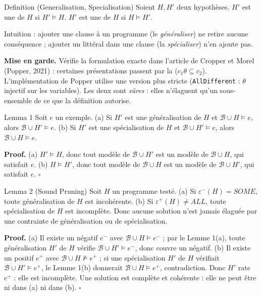 \documentclass[10pt]{article}
\begin{document}
\begin{enonce}{Definition (Generalisation, Specialisation)}
Soient $H,H'$ deux hypothèses. $H'$ est une  de $H$ si $H'\models H$.
$H'$ est une  de $H$ si $H\models H'$.
\end{enonce}
Intuition : ajouter une clause à un programme (le \emph{généraliser}) ne retire aucune conséquence ; ajouter un littéral dans une clause (la \emph{spécialiser})
n'en ajoute pas.\par\vspace{2pt}
\textbf{Mise en garde.} Vérifie la formulation exacte dans l'article de Cropper et Morel (Popper, 2021) : certaines présentations passent par la
 ($c_1\theta\subseteq c_2$). L'implémentation de Popper utilise une version plus stricte (\texttt{AllDifferent} : $\theta$ injectif sur les variables).
Les deux sont \emph{sûres} : elles n'élaguent qu'un sous-ensemble de ce que la définition autorise.

\begin{enonce}{Lemma 1}
Soit $e$ un exemple. (a) Si $H'$ est une généralisation de $H$ et $\mathcal{B}\cup H\models e$, alors $\mathcal{B}\cup H'\models e$.
(b) Si $H'$ est une spécialisation de $H$ et $\mathcal{B}\cup H'\models e$, alors $\mathcal{B}\cup H\models e$.
\end{enonce}
\textbf{Proof.} (a) $H'\models H$, donc tout modèle de $\mathcal{B}\cup H'$ est un modèle de $\mathcal{B}\cup H$, qui satisfait $e$.
(b) $H\models H'$, donc tout modèle de $\mathcal{B}\cup H$ est un modèle de $\mathcal{B}\cup H'$, qui satisfait $e$. \hfill $\square$

\begin{enonce}{Lemma 2 (Sound Pruning)}
Soit $H$ un programme testé. (a) Si $\varepsilon^-(H)=\mathit{SOME}$, toute généralisation de $H$ est incohérente. (b) Si $\varepsilon^+(H)\neq\mathit{ALL}$, toute spécialisation de $H$ est incomplète.
Donc aucune solution n'est jamais élaguée par une contrainte de généralisation ou de spécialisation.
\end{enonce}
\textbf{Proof.} (a) Il existe un négatif $e^-$ avec $\mathcal{B}\cup H\models e^-$ ; par le Lemme 1(a), toute généralisation $H'$ de $H$ vérifie $\mathcal{B}\cup H'\models e^-$, donc couvre un négatif.
(b) Il existe un positif $e^+$ avec $\mathcal{B}\cup H\not\models e^+$ ; si une spécialisation $H'$ de $H$ vérifiait $\mathcal{B}\cup H'\models e^+$, le Lemme 1(b) donnerait $\mathcal{B}\cup H\models e^+$, contradiction. Donc $H'$ rate $e^+$ : elle est incomplète.
Une solution est complète et cohérente : elle ne peut être ni dans (a) ni dans (b). \hfill $\square$
\end{document}
